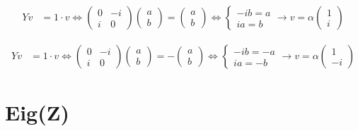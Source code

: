 \documentclass[12pt]{article}
\begin{document}
\begin{equation*}
\begin{aligned}
Yv & = 1 \cdot v \Leftrightarrow 
\begin{pmatrix}
0 & -i \\ 
i & 0 
\end{pmatrix}
\begin{pmatrix}
a \\ 
b 
\end{pmatrix}
=
\begin{pmatrix}
a \\ 
b 
\end{pmatrix}
\Leftrightarrow 
\begin{cases}
-ib = a \\
ia = b
\end{cases}
\rightarrow
v = 
\alpha
\begin{pmatrix}
1 \\ 
i 
\end{pmatrix}
\end{aligned}
\end{equation*}


\begin{equation*}
\begin{aligned}
Yv & = 1 \cdot v \Leftrightarrow 
\begin{pmatrix}
0 & -i \\ 
i & 0 
\end{pmatrix}
\begin{pmatrix}
a \\ 
b 
\end{pmatrix}
=
- \begin{pmatrix}
a \\ 
b 
\end{pmatrix}
\Leftrightarrow 
\begin{cases}
-ib = -a \\
ia = -b
\end{cases}
\rightarrow
v = 
\alpha
\begin{pmatrix}
1 \\ 
-i 
\end{pmatrix}
\end{aligned}
\end{equation*}


\section{Eig(Z)}
\end{document}
